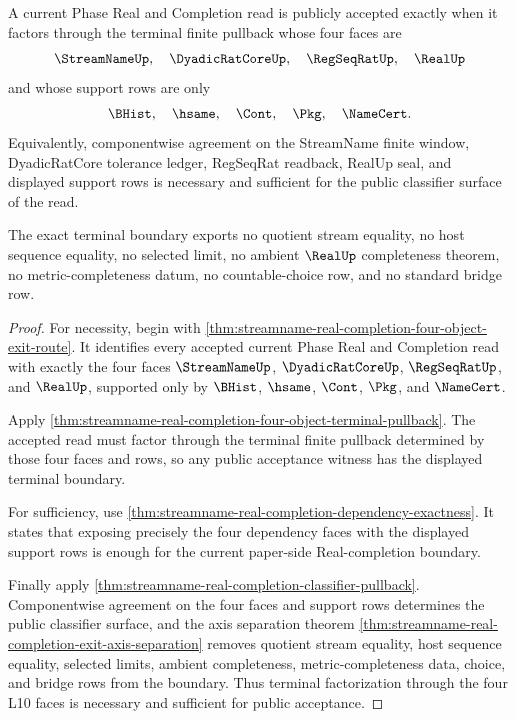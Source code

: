 \begin{theorem}
\label{thm:streamname-real-completion-four-object-terminal-exactness}
A current Phase Real and Completion read is publicly accepted exactly when it factors through the terminal finite pullback whose four faces are
$$
\StreamNameUp,\quad \DyadicRatCoreUp,\quad \RegSeqRatUp,\quad \RealUp
$$
and whose support rows are only
$$
\BHist,\quad \hsame,\quad \Cont,\quad \Pkg,\quad \NameCert.
$$
Equivalently, componentwise agreement on the StreamName finite window, DyadicRatCore tolerance ledger, RegSeqRat readback, RealUp seal, and displayed support rows is necessary and sufficient for the public classifier surface of the read.

The exact terminal boundary exports no quotient stream equality, no host sequence equality, no selected limit, no ambient $\RealUp$ completeness theorem, no metric-completeness datum, no countable-choice row, and no standard bridge row.
\end{theorem}
\begin{proof}
For necessity, begin with \autoref{thm:streamname-real-completion-four-object-exit-route}. It identifies every accepted current Phase Real and Completion read with exactly the four faces $\StreamNameUp$, $\DyadicRatCoreUp$, $\RegSeqRatUp$, and $\RealUp$, supported only by $\BHist$, $\hsame$, $\Cont$, $\Pkg$, and $\NameCert$.

Apply \autoref{thm:streamname-real-completion-four-object-terminal-pullback}. The accepted read must factor through the terminal finite pullback determined by those four faces and rows, so any public acceptance witness has the displayed terminal boundary.

For sufficiency, use \autoref{thm:streamname-real-completion-dependency-exactness}. It states that exposing precisely the four dependency faces with the displayed support rows is enough for the current paper-side Real-completion boundary.

Finally apply \autoref{thm:streamname-real-completion-classifier-pullback}. Componentwise agreement on the four faces and support rows determines the public classifier surface, and the axis separation theorem \autoref{thm:streamname-real-completion-exit-axis-separation} removes quotient stream equality, host sequence equality, selected limits, ambient completeness, metric-completeness data, choice, and bridge rows from the boundary. Thus terminal factorization through the four L10 faces is necessary and sufficient for public acceptance.
\end{proof}

